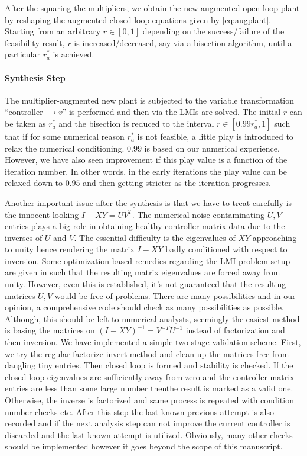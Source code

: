 After the squaring the multipliers, we obtain the new augmented open loop plant by reshaping the augmented closed
loop equations given by \eqref{eq:augplant}. Starting from an arbitrary $r\in[0,1]$ depending on the success/failure
of the feasibility result, $r$ is increased/decreased, say via a bisection algorithm, until a particular $r^*_a$ is 
achieved. 

\paragraph{Synthesis Step} The multiplier-augmented new plant is subjected to the variable transformation 
\enquote{controller $\to v$} is performed and then via  the LMIs are solved. The initial $r$ can 
be taken as $r^*_a$ and the bisection is reduced to the interval $r\in[0.99r^*_a,1]$ such that if for some numerical
reason $r^*_a$ is not feasible, a little play is introduced to relax the numerical conditioning. $0.99$ is based on our
numerical experience. However, we have also seen improvement if this play value is a function of the iteration number. 
In other words, in the early iterations the play value can be relaxed down to $0.95$ and then getting stricter as the 
iteration progresses.

Another important issue after the synthesis is that we have to treat carefully is the innocent looking $I-XY = UV^T$. The
numerical noise contaminating $U,V$ entries plays a big role in obtaining healthy controller matrix data due to the 
inverses of $U$ and $V$. The essential difficulty is the eigenvalues of $XY$ approaching to unity hence rendering the 
matrix $I-XY$ badly conditioned with respect to inversion. Some optimization-based remedies regarding the LMI problem setup 
are given in \cite{lmibook99} such that the resulting matrix eigenvalues are forced away from unity. However, even this is 
established, it's not guaranteed that the resulting matrices $U,V$ would be free of problems. There are many possibilities 
and in our opinion, a comprehensive code should check as many possibilities as possible. Although, this should be left 
to numerical analysts, seemingly the easiest method is basing the matrices on $(I-XY)^{-1}= V^{-T}U^{-1}$ instead of 
factorization and then inversion. We have implemented a simple two-stage validation scheme. First, we try the regular 
factorize-invert method and clean up the matrices free from dangling tiny entries. Then closed loop is formed and stability 
is checked. If the closed loop eigenvalues are sufficiently away from zero and the controller matrix entries are less than 
some large number thenthe result is marked as a valid one. Otherwise, the inverse is factorized and same process is repeated
with condition number checks etc. After this step the last known previous attempt is also recorded and if the next analysis 
step can not improve the current controller is discarded and the last known attempt is utilized. Obviously, many other checks 
should be implemented however it goes beyond the scope of this manuscript. 




